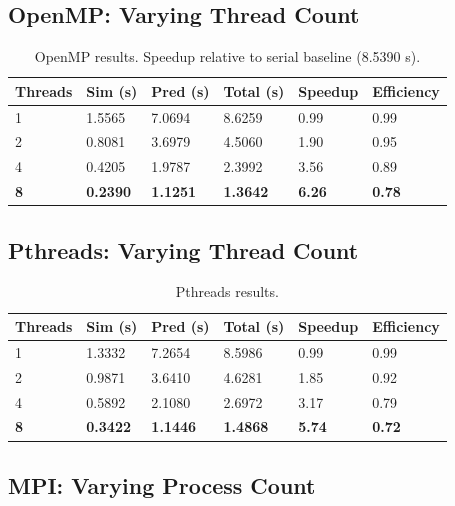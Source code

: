 \documentclass[11pt,a4paper]{article}
\begin{document}
\subsection{OpenMP: Varying Thread Count}

\begin{table}[!htbp]
\centering
\begin{tabular}{C{1.8cm} R{1.9cm} R{1.9cm} R{2.0cm} R{1.9cm} R{2.2cm}}
\toprule
\textbf{Threads} & \textbf{Sim (s)} & \textbf{Pred (s)} &
\textbf{Total (s)} & \textbf{Speedup} & \textbf{Efficiency} \\
 & 1.5565 & 7.0694 & 8.6259 & 0.99 & 0.99 \\
2 & 0.8081 & 3.6979 & 4.5060 & 1.90 & 0.95 \\
4 & 0.4205 & 1.9787 & 2.3992 & 3.56 & 0.89 \\
\textbf{8} & \textbf{0.2390} & \textbf{1.1251} & \textbf{1.3642} & \textbf{6.26} & \textbf{0.78} \\
\bottomrule
\end{tabular}
\caption{OpenMP results. Speedup relative to serial baseline (8.5390 s).}
\end{table}

\subsection{Pthreads: Varying Thread Count}

\begin{table}[!htbp]
\centering
\begin{tabular}{C{1.8cm} R{1.9cm} R{1.9cm} R{2.0cm} R{1.9cm} R{2.2cm}}
\toprule
\textbf{Threads} & \textbf{Sim (s)} & \textbf{Pred (s)} &
\textbf{Total (s)} & \textbf{Speedup} & \textbf{Efficiency} \\
 & 1.3332 & 7.2654 & 8.5986 & 0.99 & 0.99 \\
2 & 0.9871 & 3.6410 & 4.6281 & 1.85 & 0.92 \\
4 & 0.5892 & 2.1080 & 2.6972 & 3.17 & 0.79 \\
\textbf{8} & \textbf{0.3422} & \textbf{1.1446} & \textbf{1.4868} & \textbf{5.74} & \textbf{0.72} \\
\bottomrule
\end{tabular}
\caption{Pthreads results.}
\end{table}

\FloatBarrier
\subsection{MPI: Varying Process Count}
\end{document}
